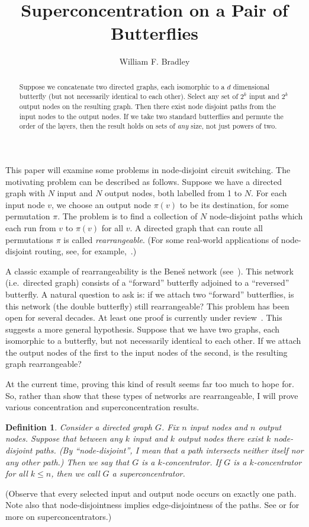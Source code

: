 \documentclass[12pt]{article}
\newtheorem{definition}{Definition}
\begin{document}
\title{Superconcentration on a Pair of Butterflies}
\author{William F. Bradley}
\maketitle



\begin{abstract}
 Suppose we concatenate two directed graphs, each isomorphic
  to a $d$ dimensional butterfly (but not necessarily identical to
  each other). Select any set of $2^{k}$ input and $2^{k}$ output
  nodes on the resulting graph.  Then there exist node disjoint paths
  from the input nodes to the output nodes.  If we take two standard
  butterflies and permute the order of the layers, then the result
  holds on sets of \emph{any} size, not just powers of two.
\end{abstract}

This paper will examine some problems in node-disjoint circuit switching.
The motivating problem can be described as follows.  
Suppose we have a directed graph with $N$ input
and $N$ output nodes, both labelled from 1 to $N$.  For each input node $v$,
we choose an output node $\pi(v)$ to be its destination, for some permutation
$\pi$.  The problem is to find a collection of $N$ node-disjoint paths 
which each run from $v$ to $\pi(v)$ for all $v$.  A directed graph that can
route all permutations $\pi$ is called \emph{rearrangeable}.
(For some real-world applications of
node-disjoint routing, see, for example,~\cite{optical_networks}.)

A classic example of rearrangeability is the Bene\v{s} 
network (see~\cite{Leighton}).  
This network (i.e.\ directed graph) consists of a ``forward'' butterfly 
adjoined to a 
``reversed'' butterfly.  A natural question to ask is: if we attach 
two ``forward'' butterflies, is this network (the 
double butterfly) still rearrangeable?
This problem has been open for several decades.  At least one proof is 
currently under review~\cite{Cam}.  This suggests a more general
hypothesis.  Suppose that we have two graphs, each isomorphic to a
butterfly, but not necessarily identical to each other.  If we attach
the output nodes of the first to the input nodes of the second, is 
the resulting graph rearrangeable?

At the current time, proving this kind of result seems far too much to
hope for.  So, rather than show that these types of networks are rearrangeable,
I will prove various concentration and superconcentration results.
\begin{definition}
Consider a directed graph $G$.  Fix $n$ input nodes and $n$ output nodes.
Suppose that between any $k$ input and $k$ output nodes there exist 
$k$ node-disjoint paths.
(By ``node-disjoint'', I mean that a path intersects
neither itself nor any other path.)  Then we say that $G$ is a
$k$-concentrator.  If $G$ is a $k$-concentrator
for all $k\leq n$, then we call $G$ a \emph{superconcentrator}.
\end{definition}
(Observe that every selected input and output node occurs on exactly one 
path.  Note also that node-disjointness implies edge-disjointness of the paths.
See \cite{Pippenger} or \cite{Hwang} for more on superconcentrators.)
\end{document}
